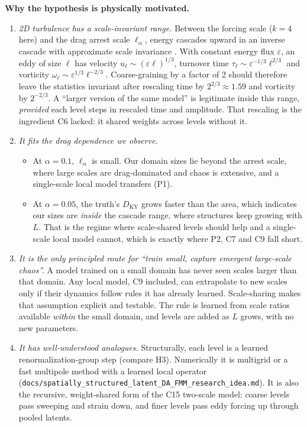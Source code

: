 \documentclass[11pt]{article}
\begin{document}
\textbf{Why the hypothesis is physically motivated.}
\begin{enumerate}[leftmargin=*]
\item \emph{2D turbulence has a scale-invariant range.} Between the
  forcing scale ($k{=}4$ here) and the drag arrest scale $\ell_\alpha$,
  energy cascades upward in an inverse cascade with approximate scale
  invariance \cite{kraichnan1967,boffettaecke2012}. With constant energy
  flux $\varepsilon$, an eddy of size $\ell$ has velocity
  $u_\ell\sim(\varepsilon\ell)^{1/3}$, turnover time
  $\tau_\ell\sim\varepsilon^{-1/3}\ell^{2/3}$ and vorticity
  $\omega_\ell\sim\varepsilon^{1/3}\ell^{-2/3}$. Coarse-graining by a
  factor of 2 should therefore leave the statistics invariant after
  rescaling time by $2^{2/3}\approx1.59$ and vorticity by $2^{-2/3}$. A
  ``larger version of the same model'' is legitimate inside this range,
  \emph{provided} each level steps in rescaled time and amplitude. That
  rescaling is the ingredient C6 lacked: it shared weights across levels
  without it.
\item \emph{It fits the drag dependence we observe.}
  \begin{itemize}[leftmargin=*]
  \item At $\alpha{=}0.1$, $\ell_\alpha$ is small. Our domain sizes lie
    beyond the arrest scale, where large scales are drag-dominated and
    chaos is extensive, and a single-scale local model transfers (P1).
  \item At $\alpha{=}0.05$, the truth's $D_{\mathrm{KY}}$ grows faster
    than the area, which indicates our sizes are \emph{inside} the
    cascade range, where structures keep growing with $L$. That is the
    regime where scale-shared levels should help and a single-scale
    local model cannot, which is exactly where P2, C7 and C9 fall short.
  \end{itemize}
\item \emph{It is the only principled route for ``train small, capture
  emergent large-scale chaos''.} A model trained on a small domain has
  never seen scales larger than that domain. Any local model, C9 included,
  can extrapolate to new scales only if their dynamics follow rules it
  has already learned. Scale-sharing makes that assumption explicit and
  testable. The rule is learned from scale ratios available
  \emph{within} the small domain, and levels are added as $L$ grows, with
  no new parameters.
\item \emph{It has well-understood analogues.} Structurally, each level
  is a learned renormalization-group step (compare H3). Numerically it
  is multigrid or a fast multipole method with a learned local operator
  (\texttt{docs/spatially\_structured\_latent\_DA\_FMM\_research\_idea.md}).
  It is also the recursive, weight-shared form of the C15 two-scale
  model: coarse levels pass sweeping and strain down, and finer levels
  pass eddy forcing up through pooled latents.
\end{enumerate}
\end{document}
